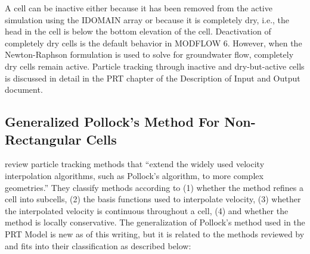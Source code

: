 A cell can be inactive either because it has been removed from the active simulation using the IDOMAIN array or because it is completely dry, i.e., the head in the cell is below the bottom elevation of the cell. Deactivation of completely dry cells is the default behavior in MODFLOW 6. However, when the Newton-Raphson formulation is used to solve for groundwater flow, completely dry cells remain active. Particle tracking through inactive and dry-but-active cells is discussed in detail in the PRT chapter of the \mf Description of Input and Output document.

\subsection{Generalized Pollock's Method For Non-Rectangular Cells} \label{sec:genpollockmethod}

\cite{zhang2012} review particle tracking methods that ``extend the widely used velocity interpolation algorithms, such as Pollock's algorithm, to more complex geometries.'' They classify methods according to (1) whether the method refines a cell into subcells, (2) the basis functions used to interpolate velocity, (3) whether the interpolated velocity is continuous throughout a cell, (4) and whether the method is locally conservative. The generalization of Pollock's method used in the PRT Model is new as of this writing, but it is related to the methods reviewed by \cite{zhang2012} and fits into their classification as described below:


